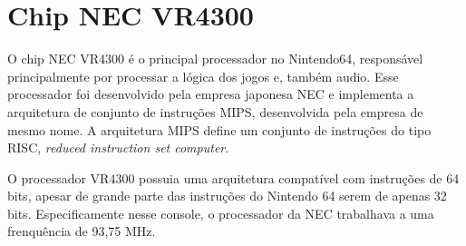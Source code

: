 \documentclass[12pt]{article}
\begin{document}
\section{Chip NEC VR4300}
    O chip NEC VR4300 é o principal processador no Nintendo64,
responsável principalmente por processar a lógica dos jogos e, 
também audio. Esse processador foi desenvolvido pela empresa japonesa
NEC e implementa a arquitetura de conjunto de instruções MIPS, 
desenvolvida pela empresa de mesmo nome. A arquitetura MIPS define um
conjunto de instruções do tipo RISC, \emph{reduced instruction set
computer}.

    O processador VR4300 possuia uma arquitetura compatível com 
instruções de 64 bits, apesar de grande parte das instruções do
Nintendo 64 serem de apenas 32 bits. Especificamente nesse console, o
processador da NEC trabalhava a uma frenquência de 93,75 MHz.
\end{document}
